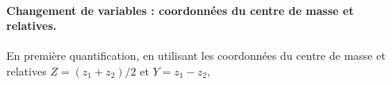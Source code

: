 \paragraph{Changement de variables : coordonnées du centre de masse et relatives.}
En première quantification, en utilisant les coordonnées du centre de masse et relatives $Z = (z_1 + z_2)/2$ et $Y = z_1 - z_2$,




